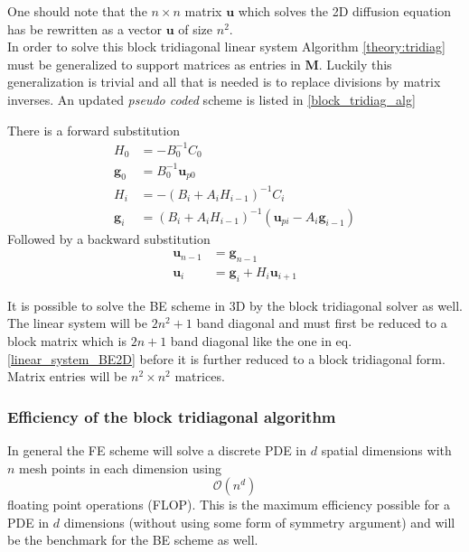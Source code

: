 One should note that the $n\times n$ matrix $\mathbf u$ which solves the 2D diffusion equation has be rewritten as a vector $\mathbf{u}$ of size $n^2$. \\ 

In order to solve this block tridiagonal linear system Algorithm \ref{theory:tridiag} must be generalized to support matrices as entries in $\mathbf M$. 
Luckily this generalization is trivial and all that is needed is to replace divisions by matrix inverses. 
An updated \emph{pseudo coded} scheme is listed in \eqref{block_tridiag_alg}

\noindent There is a forward substitution
\begin{align}\label{block_tridiag_alg}
 H_0 &= -B_0^{-1}C_0\nonumber \\
 \mathbf{g}_0 &= B_0^{-1}\mathbf{u}_{p0} \nonumber\\
 H_i &= -\left(B_i+A_iH_{i-1}\right)^{-1}C_i \nonumber \\
 \mathbf{g}_i &= \left(B_i+A_iH_{i-1}\right)^{-1}\left(\mathbf{u}_{pi}-A_i\mathbf{g}_{i-1}\right)
 \end{align}
 Followed by a backward substitution
 \begin{align*}
  \mathbf{u}_{n-1} &= \mathbf{g}_{n-1}\nonumber\\
  \mathbf{u}_i &= \mathbf{g}_i + H_i\mathbf{u}_{i+1} \nonumber
 \end{align*}
 
 \noindent It is possible to solve the BE scheme in 3D by the block tridiagonal solver as well. 
 The linear system will be $2n^2 +1$ band diagonal and must first be reduced to a block matrix which is $2n+1$ band diagonal like the one in eq. \eqref{linear_system_BE2D} before it is further reduced to a block tridiagonal form. 
 Matrix entries will be $n^2\times n^2$ matrices.
 
 \subsubsection{Efficiency of the block tridiagonal algorithm}
 
 In general the FE scheme will solve a discrete PDE in $d$ spatial dimensions with $n$ mesh points in each dimension using
 \begin{equation*}
  \mathcal O(n^d)
 \end{equation*}
floating point operations (FLOP). 
This is the maximum efficiency possible for a PDE in $d$ dimensions (without using some form of symmetry argument) and will be the benchmark for the BE scheme as well.\\

